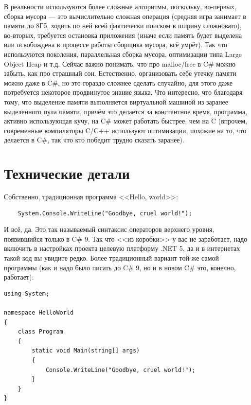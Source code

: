 \documentclass[a5paper]{article}
\begin{document}
В реальности используются более сложные алгоритмы, поскольку, во-первых, сборка мусора --- это вычислительно сложная операция (средняя игра занимает в памяти до 8Гб, ходить по ней всей фактически поиском в ширину сложновато), во-вторых, требуется остановка приложения (иначе если память будет выделена или освобождена в процессе работы сборщика мусора, всё умрёт). Так что используются поколения, параллельная сборка мусора, оптимизации типа Large Object Heap и т.д. Сейчас важно понимать, что про malloc/free в C\# можно забыть, как про страшный сон. Естественно, организовать себе утечку памяти можно даже в C\#, но это гораздо сложнее сделать случайно, для этого даже потребуется некоторое продвинутое знание языка. Что интересно, что благодаря тому, что выделение памяти выполняется виртуальной машиной из заранее выделенного пула памяти, причём это делается за константное время, программа, активно использующая кучу, на C\# может работать быстрее, чем на C (впрочем, современные компиляторы C/C++ используют оптимизации, похожие на то, что делается в C\#, так что кто победит трудно сказать заранее).

\section{Технические детали}

Собственно, традиционная программа <<Hello, world>>:

\begin{verbatim}
    System.Console.WriteLine("Goodbye, cruel world!");
\end{verbatim}

И всё, да. Это так называемый синтаксис операторов верхнего уровня, появившийся только в C\# 9. Так что <<из коробки>> у вас не заработает, надо включить в настройках проекта целевую платформу .NET 5, да и в интернетах такой код вы увидите редко. Более традиционный вариант той же самой программы (как и надо было писать до C\# 9, но и в новом C\# это, конечно, работает):

\begin{verbatim}
using System;

namespace HelloWorld
{
    class Program
    {
        static void Main(string[] args)
        {
            Console.WriteLine("Goodbye, cruel world!");
        }
    }
}
\end{verbatim}
\end{document}
